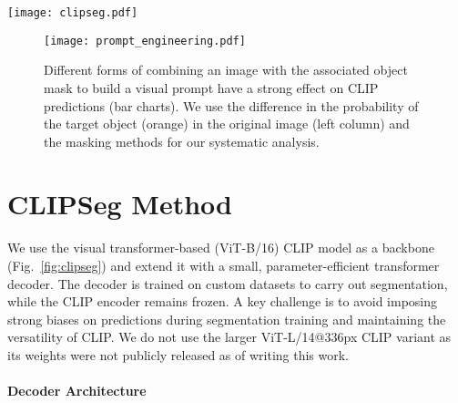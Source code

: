 \begin{figure*}
\centering
 \texttt{[image: clipseg.pdf]}
\caption{Architecture of CLIPSeg: We extend a frozen CLIP model (red and blue) with a transformer that segments the query image based on either a support image or a support prompt. $N$ CLIP activations are extracted after blocks defined by $\mathcal{S}$. The segmentation transformer and the projections (both green) are trained on PhraseCut or PhraseCut+.}\label{fig:clipseg}
\end{figure*}

\begin{figure}
\centering
\texttt{[image: prompt\_engineering.pdf]}
\caption{Different forms of combining an image with the associated object mask to build a visual prompt have a strong effect on CLIP predictions (bar charts). We use the difference in the probability of the target object (orange) in the original image (left column) and the masking methods for our systematic analysis.}
\label{fig:prompt_engineering}
\end{figure}

\section{CLIPSeg Method}

We use the visual transformer-based (ViT-B/16) CLIP \cite{radford20} model as a backbone (Fig.~\ref{fig:clipseg}) and extend it with a small, parameter-efficient transformer decoder. The decoder is trained on custom datasets to carry out segmentation, while the CLIP encoder remains frozen.
A key challenge is to avoid imposing strong biases on predictions during segmentation training and maintaining the versatility of CLIP. We do not use the larger ViT-L/14@336px CLIP variant as its weights were not publicly released as of writing this work.

\def\v{\mathbf{v}}
\def\t{\mathbf{t}}
\def\y{\mathbf{y}}
\def\q{\mathbf{q}}
\def\s{\mathbf{s}}

\paragraph{Decoder Architecture}

